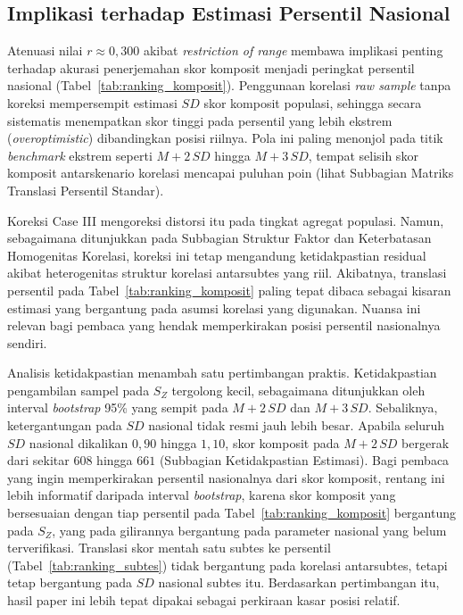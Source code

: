\subsection{Implikasi terhadap Estimasi Persentil Nasional}
Atenuasi nilai $r \approx 0,300$ akibat \textit{restriction of range} membawa implikasi penting terhadap akurasi penerjemahan skor komposit menjadi peringkat persentil nasional (Tabel~\ref{tab:ranking_komposit}). Penggunaan korelasi \textit{raw sample} tanpa koreksi mempersempit estimasi $SD$ skor komposit populasi, sehingga secara sistematis menempatkan skor tinggi pada persentil yang lebih ekstrem (\textit{overoptimistic}) dibandingkan posisi riilnya. Pola ini paling menonjol pada titik \textit{benchmark} ekstrem seperti $M + 2\,SD$ hingga $M + 3\,SD$, tempat selisih skor komposit antarskenario korelasi mencapai puluhan poin (lihat Subbagian Matriks Translasi Persentil Standar).

Koreksi Case III mengoreksi distorsi itu pada tingkat agregat populasi. Namun, sebagaimana ditunjukkan pada Subbagian Struktur Faktor dan Keterbatasan Homogenitas Korelasi, koreksi ini tetap mengandung ketidakpastian residual akibat heterogenitas struktur korelasi antarsubtes yang riil. Akibatnya, translasi persentil pada Tabel~\ref{tab:ranking_komposit} paling tepat dibaca sebagai kisaran estimasi yang bergantung pada asumsi korelasi yang digunakan. Nuansa ini relevan bagi pembaca yang hendak memperkirakan posisi persentil nasionalnya sendiri.

Analisis ketidakpastian menambah satu pertimbangan praktis. Ketidakpastian pengambilan sampel pada $S_Z$ tergolong kecil, sebagaimana ditunjukkan oleh interval \textit{bootstrap} 95\% yang sempit pada $M + 2\,SD$ dan $M + 3\,SD$. Sebaliknya, ketergantungan pada $SD$ nasional tidak resmi jauh lebih besar. Apabila seluruh $SD$ nasional dikalikan $0,90$ hingga $1,10$, skor komposit pada $M + 2\,SD$ bergerak dari sekitar $608$ hingga $661$ (Subbagian Ketidakpastian Estimasi). Bagi pembaca yang ingin memperkirakan persentil nasionalnya dari skor komposit, rentang ini lebih informatif daripada interval \textit{bootstrap}, karena skor komposit yang bersesuaian dengan tiap persentil pada Tabel~\ref{tab:ranking_komposit} bergantung pada $S_Z$, yang pada gilirannya bergantung pada parameter nasional yang belum terverifikasi. Translasi skor mentah satu subtes ke persentil (Tabel~\ref{tab:ranking_subtes}) tidak bergantung pada korelasi antarsubtes, tetapi tetap bergantung pada $SD$ nasional subtes itu. Berdasarkan pertimbangan itu, hasil paper ini lebih tepat dipakai sebagai perkiraan kasar posisi relatif.


